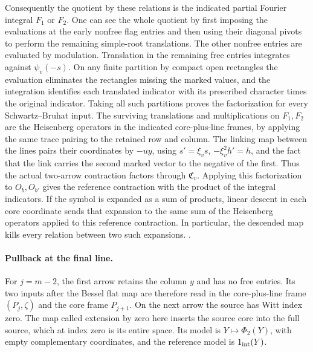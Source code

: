 Consequently the quotient by these relations is the indicated
partial Fourier integral \(F_1\) or \(F_2\). One can see the
whole quotient by first imposing the evaluations at the early
nonfree flag entries and then using their diagonal pivots to
perform the remaining simple-root translations. The other
nonfree entries are evaluated by modulation. Translation in the
remaining free entries integrates against \(\psi_v(-s)\).
On any finite partition by compact open rectangles the
evaluation eliminates the rectangles missing the marked values,
and the integration identifies each translated indicator with
its prescribed character times the original indicator. Taking
all such partitions proves the factorization for every
Schwartz--Bruhat input. The surviving translations and
multiplications on \(F_1,F_2\) are the Heisenberg operators in
the indicated core-plus-line frames, by applying the same
trace pairing to the retained row and column. The linking
map between the lines pairs their coordinates by \(-uy\),
using \(s'=\xi_vs\), \(-\xi_v^2h'=h\), and the fact that
the link carries the second marked vector to the negative of
the first. Thus the actual two-arrow contraction factors through
\(\mathfrak C_v\). Applying this factorization to \(O_b,O_{b'}\)
gives the reference contraction with the product of the integral
indicators. If the symbol is expanded as a sum of products,
linear descent in each core coordinate sends that expansion
to the same sum of the Heisenberg operators applied to this
reference contraction. In particular, the descended map kills
every relation between two such expansions.
.

\paragraph{Pullback at the final line.}
For \(j=m-2\), the first arrow retains the column \(y\) and
has no free entries. Its two inputs after the Bessel flat map
are therefore read in the core-plus-line frame
\((P_j,\zeta)\) and the core frame \(P_{j+1}\).
On the next arrow the source has Witt index zero. The map
called extension by zero here inserts the source core into the
full source, which at index zero is its entire space. Its model
is \(Y\mapsto\Phi_2(Y)\), with empty complementary coordinates,
and the reference model is \(1_{\rm int}(Y)\).


